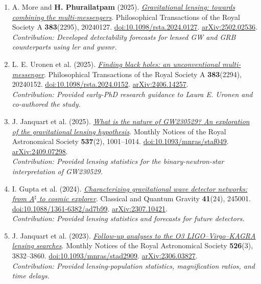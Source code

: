 \documentclass[11pt]{article}
\begin{document}
\begin{enumerate}
\item A. More and \textbf{H. Phurailatpam} (2025). \href{https://doi.org/10.1098/rsta.2024.0127}{\textit{Gravitational lensing: towards combining the multi-messengers}}. Philosophical Transactions of the Royal Society A \textbf{383}(2295), 20240127. \href{https://doi.org/10.1098/rsta.2024.0127}{doi:10.1098/rsta.2024.0127}. \href{https://arxiv.org/abs/2502.02536}{arXiv:2502.02536}.\\\emph{Contribution: Developed detectability forecasts for lensed GW and GRB counterparts using ler and gwsnr.}
\item L. E. Uronen et al. (2025). \href{https://doi.org/10.1098/rsta.2024.0152}{\textit{Finding black holes: an unconventional multi-messenger}}. Philosophical Transactions of the Royal Society A \textbf{383}(2294), 20240152. \href{https://doi.org/10.1098/rsta.2024.0152}{doi:10.1098/rsta.2024.0152}. \href{https://arxiv.org/abs/2406.14257}{arXiv:2406.14257}.\\\emph{Contribution: Provided early-PhD research guidance to Laura E. Uronen and co-authored the study.}
\item J. Janquart et al. (2025). \href{https://doi.org/10.1093/mnras/staf049}{\textit{What is the nature of GW230529? An exploration of the gravitational lensing hypothesis}}. Monthly Notices of the Royal Astronomical Society \textbf{537}(2), 1001--1014. \href{https://doi.org/10.1093/mnras/staf049}{doi:10.1093/mnras/staf049}. \href{https://arxiv.org/abs/2409.07298}{arXiv:2409.07298}.\\\emph{Contribution: Provided lensing statistics for the binary-neutron-star interpretation of GW230529.}
\item I. Gupta et al. (2024). \href{https://doi.org/10.1088/1361-6382/ad7b99}{\textit{Characterizing gravitational wave detector networks: from A$^\sharp$ to cosmic explorer}}. Classical and Quantum Gravity \textbf{41}(24), 245001. \href{https://doi.org/10.1088/1361-6382/ad7b99}{doi:10.1088/1361-6382/ad7b99}. \href{https://arxiv.org/abs/2307.10421}{arXiv:2307.10421}.\\\emph{Contribution: Provided lensing statistics and forecasts for future detectors.}
\item J. Janquart et al. (2023). \href{https://doi.org/10.1093/mnras/stad2909}{\textit{Follow-up analyses to the O3 LIGO--Virgo--KAGRA lensing searches}}. Monthly Notices of the Royal Astronomical Society \textbf{526}(3), 3832--3860. \href{https://doi.org/10.1093/mnras/stad2909}{doi:10.1093/mnras/stad2909}. \href{https://arxiv.org/abs/2306.03827}{arXiv:2306.03827}.\\\emph{Contribution: Provided lensing-population statistics, magnification ratios, and time delays.}

\end{enumerate}
\end{document}
